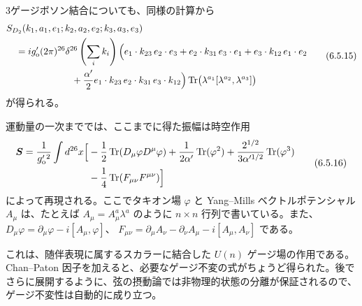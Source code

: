 3ゲージボソン結合についても、同様の計算から
\begin{equation}
\begin{aligned}
&S_{D_2}(k_1,a_1,e_1;k_2,a_2,e_2;k_3,a_3,e_3)\\
&\quad=ig'_{\mathrm o}(2\pi)^{26}\delta^{26}\left(\sum_i k_i\right)
\Bigl(e_1\cdot k_{23}\,e_2\cdot e_3
+e_2\cdot k_{31}\,e_3\cdot e_1
+e_3\cdot k_{12}\,e_1\cdot e_2\\
&\hspace{7em}+\frac{\alpha'}2
e_1\cdot k_{23}\,e_2\cdot k_{31}\,e_3\cdot k_{12}\Bigr)
\operatorname{Tr}\bigl(\lambda^{a_1}[\lambda^{a_2},\lambda^{a_3}]\bigr)
\end{aligned}
\tag{6.5.15}\label{eq:6.5.15}
\end{equation}
が得られる。

運動量の一次まででは、ここまでに得た振幅は時空作用
\begin{equation}
\begin{aligned}
\boldsymbol S=\frac1{g_{\mathrm o}'{}^2}
\int d^{26}x\Bigl[
&-\frac12\operatorname{Tr}(D_\mu\varphi D^\mu\varphi)
+\frac1{2\alpha'}\operatorname{Tr}(\varphi^2)
+\frac{2^{1/2}}{3\alpha'^{1/2}}\operatorname{Tr}(\varphi^3)\\
&-\frac14\operatorname{Tr}(F_{\mu\nu}F^{\mu\nu})
\Bigr]
\end{aligned}
\tag{6.5.16}\label{eq:6.5.16}
\end{equation}
によって再現される。ここでタキオン場 $\varphi$ と Yang--Mills ベクトルポテンシャル $A_\mu$ は、たとえば $A_\mu=A^a_\mu\lambda^a$ のように $n\times n$ 行列で書いている。また、
$D_\mu\varphi=\partial_\mu\varphi-i[A_\mu,\varphi]$、
$F_{\mu\nu}=\partial_\mu A_\nu-\partial_\nu A_\mu-i[A_\mu,A_\nu]$
である。

これは、随伴表現に属するスカラーに結合した $U(n)$ ゲージ場の作用である。Chan--Paton 因子を加えると、必要なゲージ不変の式がちょうど得られた。後でさらに展開するように、弦の摂動論では非物理的状態の分離が保証されるので、ゲージ不変性は自動的に成り立つ。

